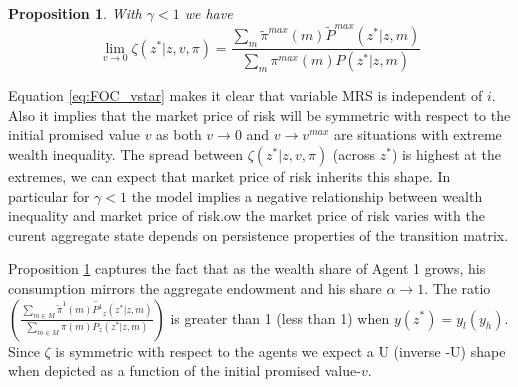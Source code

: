 \documentclass[12pt]{article}
\newtheorem{proposition}{Proposition}
\begin{document}
%




\begin{proposition}
\label{propo-6}
With $\gamma < 1$ we have 
\[\lim_{v\to 0} \zeta(z^*|z,v,\pi) = \frac{\sum_{m}\tilde{\pi}^{max}(m)\tilde{P}^{max}(z^*|z,m)}{\sum_{m}{\pi}^{max}(m){P}(z^*|z,m)}\]
\end{proposition}



Equation \ref{eq:FOC_vstar} makes it clear that variable MRS is independent of $i$. Also it implies that the market price of risk will be symmetric with respect to the initial promised value $v$ as both  $v \to 0$ and $v \to v^{max}$ are situations with extreme wealth inequality. The spread 
between $\zeta(z^*|z,v,\pi)$ (across $z^*$) is highest at the extremes, we can expect that market price of risk inherits this shape. In particular for $\gamma <1$ the model implies a negative relationship between wealth inequality and market price of risk.ow the market price of risk varies with the curent aggregate state depends on persistence properties of the transition matrix. 

Proposition \ref{propo-6} captures the fact that as the wealth share of Agent 1 grows, his consumption mirrors the aggregate endowment and his share $\alpha \to 1$. The ratio $\left(\frac{\sum_{m \in M}\tilde{\pi}^{1}(m)\tilde{P^1}_z(z^* |z,m)}{\sum_{m \in M}{\pi(m)P_{z}(z^*|z,m)}} \right)$ is greater than 1 (less than 1) when $y(z^*)=y_l (y_h)$. Since $\zeta$ is symmetric with respect to the agents we expect a U (inverse -U) shape when depicted as a function of the initial promised value-$v$.
\end{document}
